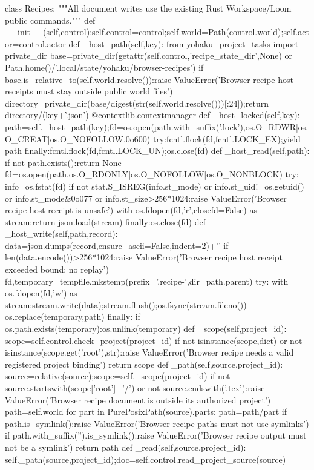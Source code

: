 class Recipes:
 """All document writes use the existing Rust Workspace/Loom public commands."""
 def __init__(self,control):self.control=control;self.world=Path(control.world);self.actor=control.actor
 def _host_path(self,key):
  from yohaku_project_tasks import private_dir
  base=private_dir(getattr(self.control,'recipe_state_dir',None) or Path.home()/'.local/state/yohaku/browser-recipes')
  if base.is_relative_to(self.world.resolve()):raise ValueError('Browser recipe host receipts must stay outside public world files')
  directory=private_dir(base/digest(str(self.world.resolve()))[:24]);return directory/(key+'.json')
 @contextlib.contextmanager
 def _host_locked(self,key):
  path=self._host_path(key);fd=os.open(path.with_suffix('.lock'),os.O_RDWR|os.O_CREAT|os.O_NOFOLLOW,0o600)
  try:fcntl.flock(fd,fcntl.LOCK_EX);yield path
  finally:fcntl.flock(fd,fcntl.LOCK_UN);os.close(fd)
 def _host_read(self,path):
  if not path.exists():return None
  fd=os.open(path,os.O_RDONLY|os.O_NOFOLLOW|os.O_NONBLOCK)
  try:
   info=os.fstat(fd)
   if not stat.S_ISREG(info.st_mode) or info.st_uid!=os.getuid() or info.st_mode&0o077 or info.st_size>256*1024:raise ValueError('Browser recipe host receipt is unsafe')
   with os.fdopen(fd,'r',closefd=False) as stream:return json.load(stream)
  finally:os.close(fd)
 def _host_write(self,path,record):
  data=json.dumps(record,ensure_ascii=False,indent=2)+'\n'
  if len(data.encode())>256*1024:raise ValueError('Browser recipe host receipt exceeded bound; no replay')
  fd,temporary=tempfile.mkstemp(prefix='.recipe-',dir=path.parent)
  try:
   with os.fdopen(fd,'w') as stream:stream.write(data);stream.flush();os.fsync(stream.fileno())
   os.replace(temporary,path)
  finally:
   if os.path.exists(temporary):os.unlink(temporary)
 def _scope(self,project_id):
  scope=self.control.check_project(project_id)
  if not isinstance(scope,dict) or not isinstance(scope.get('root'),str):raise ValueError('Browser recipe needs a valid registered project binding')
  return scope
 def _path(self,source,project_id):
  source=relative(source);scope=self._scope(project_id)
  if not source.startswith(scope['root']+'/') or not source.endswith('.tex'):raise ValueError('Browser recipe document is outside its authorized project')
  path=self.world
  for part in PurePosixPath(source).parts:
   path=path/part
   if path.is_symlink():raise ValueError('Browser recipe paths must not use symlinks')
  if path.with_suffix('').is_symlink():raise ValueError('Browser recipe output must not be a symlink')
  return path
 def _read(self,source,project_id):
  self._path(source,project_id);doc=self.control.read_project_source(source)
